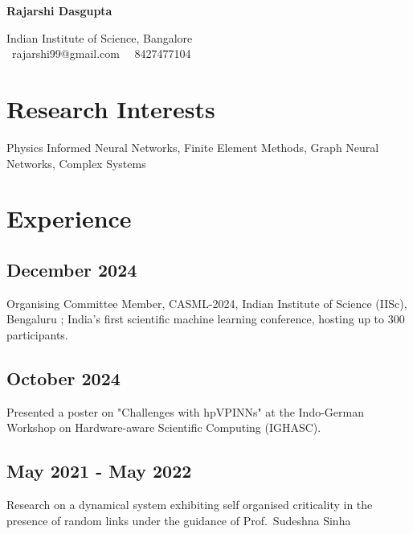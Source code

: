 \documentclass{article}
\newcommand{\theauthor}{Rajarshi Dasgupta}
\begin{document}
\begin{center}
	{\bf \huge \theauthor}

	\vspace{1em}

	Indian Institute of Science, Bangalore\\
	\Letter \, rajarshi99@gmail.com \,
	\faMobilePhone \, 8427477104
\end{center}

\section{Research Interests}

Physics Informed Neural Networks,
Finite Element Methods,
Graph Neural Networks,
Complex Systems

\section{Experience}

\subsection{December 2024}
Organising Committee Member, CASML-2024, Indian Institute of Science (IISc), Bengaluru ;
India's first scientific machine learning conference, hosting up to 300 participants.

\subsection{October 2024}
Presented a poster on "Challenges with hpVPINNs"
at the Indo-German Workshop on Hardware-aware Scientific Computing (IGHASC).

\subsection{May 2021 - May 2022}
Research on a dynamical system
exhibiting self organised criticality
in the presence of random links
under the guidance of Prof.~Sudeshna Sinha

\end{document}
